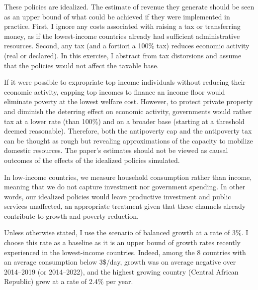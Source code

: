 These policies are idealized. The estimate of revenue they generate should be seen as an upper bound of what could be achieved if they were implemented in practice. 
First, I ignore any costs associated with raising a tax or transferring money, as if the lowest-income countries already had sufficient administrative resources. Second, any tax (and a fortiori a 100\% tax) reduces economic activity (real or declared). In this exercise, I abstract from tax distorsions and assume that the policies would not affect the taxable base.%

If it were possible to expropriate top income individuals 
without reducing their economic activity, capping top incomes to finance an income floor would eliminate poverty at the lowest welfare cost. 
However, to protect private property and diminish the deterring effect on economic activity, governments would rather tax at a lower rate (than 100\%) and on a broader base (starting at a threshold deemed reasonable). 
Therefore, both the antipoverty cap and the antipoverty tax can be thought as rough but revealing approximations of the capacity to mobilize domestic resources. The paper's estimates should not be viewed as causal outcomes of the effects of the idealized policies simulated.

In low-income countries, we measure household consumption rather than income, meaning that we do not capture investment nor government spending. In other words, our idealized policies would leave productive investment and public services unaffected, an appropriate treatment given that these channels already contribute to growth and poverty reduction.%

Unless otherwise stated, I use the scenario of balanced growth at a rate of 3\%. I choose this rate as a baseline as it is an upper bound of growth rates recently experienced in the lowest-income countries. Indeed, among the 8 countries with an average consumption below 3\$/day, growth was on average negative over 2014--2019 (or 2014--2022), and the highest growing country (Central African Republic) grew at a rate of 2.4\% per year. %

